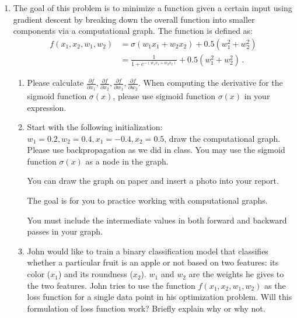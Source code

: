 \documentclass[a4paper]{article}
\begin{document}
\begin{enumerate}
\item The goal of this problem is to minimize a function given a certain input using gradient descent by breaking down the overall function into smaller components via a computational graph. The function is defined as:
\begin{align*}
f(x_1, x_2, w_1, w_2) & = \sigma(w_1 x_1+w_2 x_2) + 0.5(w_1^2 + w_2^2) \\
& =  \frac{1}{1+e^{-(w_1 x_1+w_2 x_2)}} + 0.5(w_1^2 + w_2^2)\,.
\end{align*}
\begin{enumerate}
\item Please calculate $\frac{\partial f}{\partial x_1}, \frac{\partial f}{\partial x_2}, \frac{\partial f}{\partial w_1}, \frac{\partial f}{\partial w_2}$. 
% 
When computing the derivative for the sigmoid function $\sigma(x)$, please use sigmoid function $\sigma(x)$ in your expression.


\item Start with the following initialization: $w_1 = 0.2, w_2 = 0.4, x_1 = -0.4, x_2 = 0.5$, draw the computational graph. Please use backpropagation as we did in class. You may use the sigmoid function $\sigma(x)$ as a node in the graph.

You can draw the graph on paper and insert a photo into your report.

The goal is for you to practice working with computational graphs.

You must include the intermediate values in both forward and backward passes in your graph.

\item John would like to train a binary classification model that classifies whether a particular fruit is an apple or not based on two features: its color ($x_1$) and its roundness ($x_2$). 
% 
$w_1$ and $w_2$ are the weights he gives to the two features. 
% 
John tries to use the function $f(x_1, x_2, w_1, w_2)$ as the loss function for a single data point in his optimization problem. 
% 
Will this formulation of loss function work? 
% 
Briefly explain why or why not.
\end{enumerate}


\end{enumerate}
\end{document}
